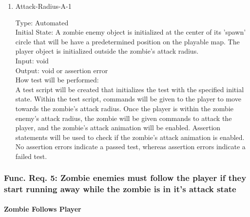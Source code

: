 \documentclass[12pt, titlepage]{article}
\begin{document}
\begin{enumerate}

\item{Attack-Radius-A-1\\}

Type: Automated\\
					
Initial State: A zombie enemy object is initialized at the center of its 'spawn' circle that will be have a predetermined position on the playable map. The player object is initialized outside the zombie's attack radius.\\
					
Input: void \\
					
Output: void or assertion error \\
					
How test will be performed:\\  A test script will be created that initializes the test with the specified initial state. Within the test script, commands will be given to the player to move towards the zombie's attack radius.  Once the player is within the zombie enemy's attack radius, the zombie will be given commands to attack the player, and the zombie's attack animation will be enabled. Assertion statements will be used to check if the zombie's attack animation is enabled. No assertion errors indicate a passed test, whereas assertion errors indicate a failed test.\\

\end{enumerate}

\subsubsection{Func. Req. 5: Zombie enemies must follow the player if they start running away while the zombie is in it's attack state}

\paragraph{Zombie Follows Player}
\end{document}
